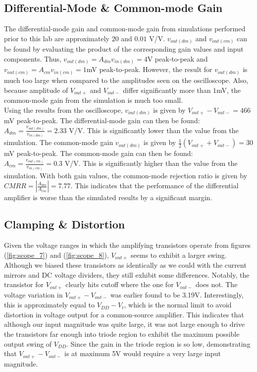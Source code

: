 \subsection{Differential-Mode \& Common-mode Gain}

The differential-mode gain and common-mode gain from simulations performed prior to this lab are approximately $20$ and $0.01$ \si{\volt}/\si{\volt}.
$v_{out(dm)}$ and $v_{out(cm)}$ can be found by evaluating the product of the corresponding gain values and input components.
Thus, $v_{out(dm)} = A_{dm}v_{in(dm)} = 4$\si{\volt} peak-to-peak and $v_{out(cm)} = A_{cm}v_{in(cm)} = 1$\si{\milli\volt} peak-to-peak.
However, the result for $v_{out(dm)}$ is much too large when compared to the amplitudes seen on the oscilloscope.
Also, because amplitude of $V_{out+}$ and $V_{out-}$ differ significantly more than $1$\si{\milli\volt}, the common-mode gain from the simulation is much too small.\\

Using the results from the oscilloscope, $v_{out(dm)}$ is given by $V_{out+} - V_{out-} = 466$\si{\milli\volt} peak-to-peak.
The differential-mode gain can then be found: $A_{dm} = \frac{v_{out(dm)}}{v_{in(dm)}} = 2.33$ \si{\volt}/\si{\volt}.
This is significantly lower than the value from the simulation.
The common-mode gain $v_{out(dm)}$ is given by $\frac{1}{2}(V_{out+} + V_{out-}) = 30$\si{\milli\volt} peak-to-peak.
The common-mode gain can then be found: $A_{cm} = \frac{v_{out(cm)}}{v_{in(cm)}} = 0.3$ \si{\volt}/\si{\volt}.
This is significantly higher than the value from the simulation.
With both gain values, the common-mode rejection ratio is given by $CMRR = |\frac{A_{dm}}{A_{cm}}| = 7.77$.
This indicates that the performance of the differential amplifier is worse than the simulated results by a significant margin. \\

\subsection{Clamping \& Distortion}

Given the voltage ranges in which the amplifying transistors operate from figures (\ref{fig:scope_7}) and (\ref{fig:scope_8}), $V_{out+}$ seems to exhibit a larger swing.
Although we biased these transistors as identically as we could with the current mirrors and DC voltage dividers, they still exhibit some differences.
Notably, the transistor for $V_{out+}$ clearly hits cutoff where the one for $V_{out-}$ does not.
The voltage variation in $V_{out+} - V_{out-}$ was earlier found to be 3.19\si{\volt}.
Interestingly, this is approximately equal to $V_{DD} - V_{t}$, which is the normal limit to avoid distortion in voltage output for a common-source amplifier.
This indicates that although our input magnitude was quite large, it was not large enough to drive the transistors far enough into triode region to exhibit the maximum possible output swing of $V_{DD}$.
Since the gain in the triode region is so low, demonstrating that $V_{out+} - V_{out-}$ is at maximum 5V would require a very large input magnitude.

